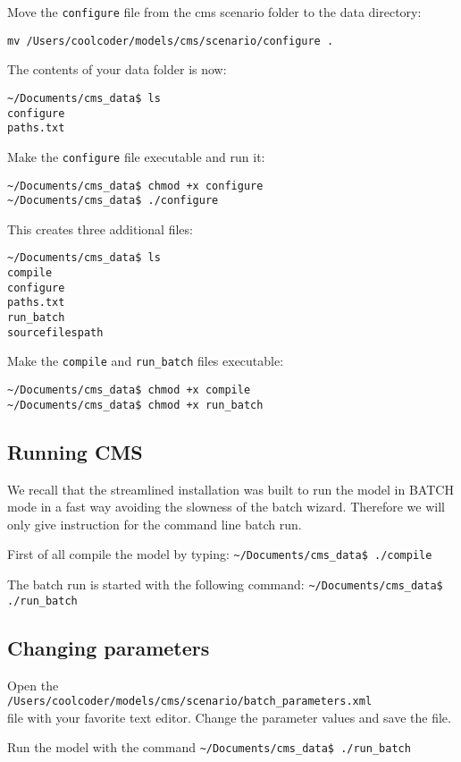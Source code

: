 \documentclass{article}
\begin{document}
Move the \verb+configure+ file from the cms scenario folder to the data directory:

\verb+mv /Users/coolcoder/models/cms/scenario/configure . +


The contents of your data folder is now:

\vskip2mm
\noindent\verb+~/Documents/cms_data$ +\color{red}\verb+ls+ \color{blue}\\
\verb+configure+ \\
\verb+paths.txt+
\color{black}

\vskip2mm
Make the \verb+configure+ file executable and run it:

\vskip2mm
\noindent\verb+~/Documents/cms_data$ +\color{red}\verb|chmod +x configure| \color{black}\\
\verb+~/Documents/cms_data$ +\color{red}\verb|./configure| \color{black}

\vskip2mm
This creates three additional files:

\vskip2mm
\noindent\verb+~/Documents/cms_data$ +\color{red}\verb+ls+ \color{blue}\\
\verb+compile+\\ \color{green}
\verb+configure+\\ \color{blue}
\verb+paths.txt+ \\
\verb+run_batch+ \\
\verb+sourcefilespath+
\color{black}

\vskip2mm
Make the \verb+compile+ and \verb+run_batch+ files executable:

\vskip2mm
\noindent\verb+~/Documents/cms_data$ +\color{red}\verb|chmod +x compile| \color{black}\\
\verb+~/Documents/cms_data$ +\color{red}\verb|chmod +x run_batch| \color{black}
\vskip2mm


\subsection{Running CMS}

We recall that the streamlined installation was built to run the model in BATCH mode in a fast way avoiding the slowness of the batch wizard. Therefore we will only give instruction for the command line batch run.

First of all compile the model by typing:
\vskip2mm
\noindent\verb+~/Documents/cms_data$ +\color{red}\verb|./compile| \color{black}
\vskip2mm

The batch run is started with the following command:
\vskip2mm
\noindent\verb+~/Documents/cms_data$ +\color{red}\verb|./run_batch| \color{black}
\vskip2mm

\subsection{Changing parameters}

Open the\\
\verb+/Users/coolcoder/models/cms/scenario/batch_parameters.xml+ \\
file with your favorite text editor. Change the parameter values and save the file.

Run the model with the command
\vskip2mm
\noindent\verb+~/Documents/cms_data$ +\color{red}\verb|./run_batch| \color{black}
\vskip2mm
\end{document}
